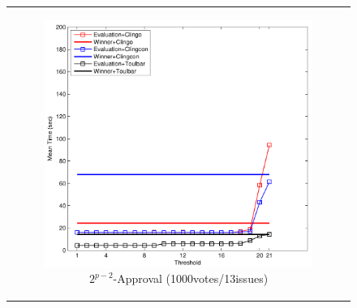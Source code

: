 
\begin{figure}[!ht]
	\centering
	\setlength{\tabcolsep}{0mm}
	\begin{tabular}{c}
  \begin{subfigure}[b]{0.5\textwidth}
		\includegraphics[width=\textwidth]{figs/expAppMSCICP_1000v_13i.pdf}
		\caption{$2^{p-2}$-Approval (1000votes/13issues)}
		\label{fig:comparison:eval:1}
	\end{subfigure}
  \begin{subfigure}[b]{0.5\textwidth}

\end{subfigure}
\end{tabular}
\end{figure}
